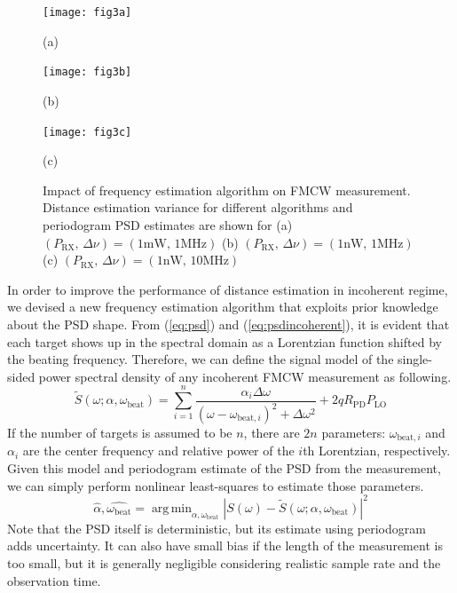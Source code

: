 \documentclass{article}
\DeclareMathOperator*{\argmin}{arg\,min}
\begin{document}
\begin{figure}[t!]
\begin{minipage}[b]{1.0\linewidth}
  \centering
  \centerline{\texttt{[image: fig3a]}}
  \vspace{-0.5em}
  \centerline{(a)}\medskip
  \vspace{-0.5em}
\end{minipage}
\begin{minipage}[b]{1.0\linewidth}
  \centering
  \centerline{\texttt{[image: fig3b]}}
  \vspace{-0.5em}
  \centerline{(b)}\medskip
  \vspace{-0.5em}
\end{minipage}
\begin{minipage}[b]{1.0\linewidth}
  \centering
  \centerline{\texttt{[image: fig3c]}}
  \vspace{-0.5em}
  \centerline{(c)}\medskip
   \vspace{-1em}
\end{minipage}
\caption{Impact of frequency estimation algorithm on FMCW measurement. Distance estimation variance for different algorithms and periodogram PSD estimates are shown for (a) $(P_\text{RX},\,\Delta\nu)=(\text{1mW},\,\text{1MHz})$ (b) $(P_\text{RX},\,\Delta\nu)=(\text{1nW},\,\text{1MHz})$ (c) $(P_\text{RX},\,\Delta\nu)=(\text{1nW},\,\text{10MHz})$}
  \vspace{-1em}
\label{fig:res}
\end{figure}


In order to improve the performance of distance estimation in incoherent regime, we devised a new frequency estimation algorithm that exploits prior knowledge about the PSD shape. From (\ref{eq:psd}) and (\ref{eq:psdincoherent}), it is evident that each target shows up in the spectral domain as a Lorentzian function shifted by the beating frequency. Therefore, we can define the signal model of the single-sided power spectral density of any incoherent FMCW measurement as following.
\begin{equation}\label{eq:signalmodel}
\tilde{S}(\omega; \alpha, \omega_\text{beat}) = \sum_{i=1}^{n}{\frac{\alpha_i \Delta\omega}{(\omega-\omega_{\text{beat},i})^2+\Delta\omega^2}}+2qR_\text{PD}P_\text{LO}
\end{equation}
If the number of targets is assumed to be $n$, there are $2n$ parameters: $\omega_{\text{beat},i}$ and $\alpha_i$ are the center frequency and relative power of the $i$th Lorentzian, respectively. Given this model and periodogram estimate of the PSD from the measurement, we can simply perform nonlinear least-squares  to estimate those parameters. 
\begin{equation}\label{eq:nls}
\hat{\alpha},\hat{\omega_\text{beat}} = \argmin_{\alpha,\omega_\text{beat}}{\left|S(\omega)-\tilde{S}(\omega; \alpha, \omega_\text{beat})\right|^2}
\end{equation}
Note that the PSD itself is deterministic, but its estimate using periodogram adds uncertainty. It can also have small bias if the length of the measurement is too small, but it is generally negligible considering realistic sample rate and the observation time.
\end{document}
